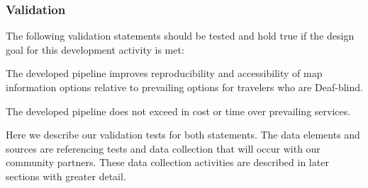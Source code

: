 \subsubsection{Validation}

The following validation statements should be tested and hold true if the design goal for this development activity is met: 

The developed pipeline improves reproducibility and accessibility of map information options relative to prevailing options for travelers who are Deaf-blind.

The developed pipeline does not exceed in cost or time over prevailing services.

Here we describe our validation tests for both statements. The data elements and sources are referencing tests and data collection that will occur with our community partners. These data collection activities are described in later sections with greater detail.

